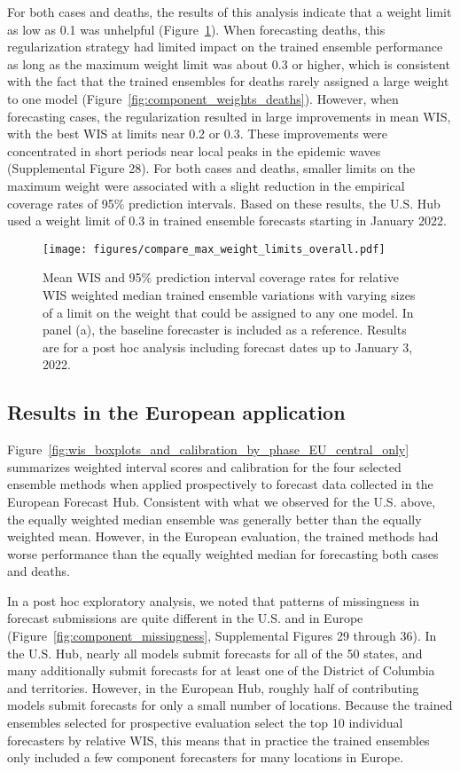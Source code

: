 \documentclass[11pt,3p,authoryear]{elsarticle}
\begin{document}
For both cases and deaths, the results of this analysis indicate that a weight limit as low as 0.1 was unhelpful (Figure~\ref{fig:max_weight_limits_overall}).
When forecasting deaths, this regularization strategy had limited impact on the trained ensemble performance as long as the maximum weight limit was about 0.3 or higher, which is consistent with the fact that the trained ensembles for deaths rarely assigned a large weight to one model (Figure~\ref{fig:component_weights_deaths}).
However, when forecasting cases, the regularization resulted in large improvements in mean WIS, with the best WIS at limits near 0.2 or 0.3.
These improvements were concentrated in short periods near local peaks in the epidemic waves (Supplemental Figure 28).
For both cases and deaths, smaller limits on the maximum weight were associated with a slight reduction in the empirical coverage rates of 95\% prediction intervals.
Based on these results, the U.S. Hub used a weight limit of 0.3 in trained ensemble forecasts starting in January 2022.

\begin{figure}
\texttt{[image: figures/compare\_max\_weight\_limits\_overall.pdf]}
\caption{Mean WIS and 95\% prediction interval coverage rates for relative WIS weighted median trained ensemble variations with varying sizes of a limit on the weight that could be assigned to any one model. In panel (a), the baseline forecaster is included as a reference. Results are for a post hoc analysis including forecast dates up to January 3, 2022.}
\label{fig:max_weight_limits_overall}
\end{figure}

\subsection{Results in the European application}
\label{subsec:results_eu}

Figure~\ref{fig:wis_boxplots_and_calibration_by_phase_EU_central_only} summarizes weighted interval scores and calibration for the four selected ensemble methods when applied prospectively to forecast data collected in the European Forecast Hub. Consistent with what we observed for the U.S. above, the equally weighted median ensemble was generally better than the equally weighted mean. However, in the European evaluation, the trained methods had worse performance than the equally weighted median for forecasting both cases and deaths.

In a post hoc exploratory analysis, we noted that patterns of missingness in forecast submissions are quite different in the U.S. and in Europe (Figure~\ref{fig:component_missingness}, Supplemental Figures 29 through 36). In the U.S. Hub, nearly all models submit forecasts for all of the 50 states, and many additionally submit forecasts for at least one of the District of Columbia and territories. However, in the European Hub, roughly half of contributing models submit forecasts for only a small number of locations. Because the trained ensembles selected for prospective evaluation select the top 10 individual forecasters by relative WIS, this means that in practice the trained ensembles only included a few component forecasters for many locations in Europe.
\end{document}
